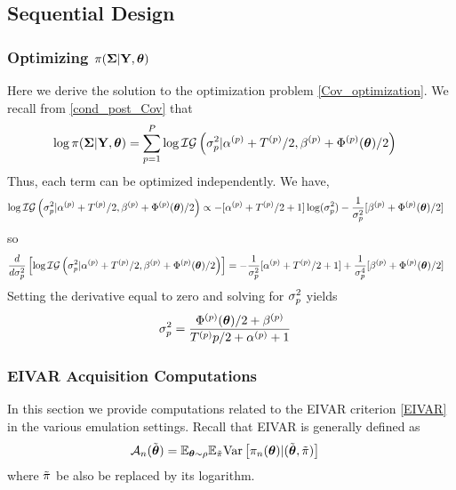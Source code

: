 \documentclass[12pt]{article}
\begin{document}
\subsection{Sequential Design}
\subsubsection{Optimizing $\pi(\boldsymbol{\Sigma}|\mathbf{Y}, \boldsymbol{\theta})$}
Here we derive the solution to the optimization problem \ref{Cov_optimization}. We recall from \ref{cond_post_Cov} that 
\begin{align*}
\log \pi(\boldsymbol{\Sigma}|\mathbf{Y}, \boldsymbol{\theta}) &= \sum_{p = 1}^{P} \log \mathcal{IG}\left(\sigma_{p}^2|{\alpha}^{(p)} + {T}^{(p)}/2, {\beta}^{(p)} + {\Phi}^{(p)}(\boldsymbol{\theta})/2 \right)
\end{align*}
Thus, each term can be optimized independently. We have, 
\begin{align*}
\log \mathcal{IG}\left(\sigma_{p}^2|{\alpha}^{(p)} + {T}^{(p)}/2, {\beta}^{(p)} + {\Phi}^{(p)}(\boldsymbol{\theta})/2 \right) &\propto -[{\alpha}^{(p)} + {T}^{(p)}/2 + 1]\log(\sigma^2_{p})
																									       - \frac{1}{\sigma^2_{p}} [{\beta}^{(p)} + {\Phi}^{(p)}(\boldsymbol{\theta})/2]
\end{align*}
so 
\begin{align*}
\frac{d}{d\sigma_{p}^2}\left[\log \mathcal{IG}\left(\sigma_{p}^2|{\alpha}^{(p)} + {T}^{(p)}/2, {\beta}^{(p)} + {\Phi}^{(p)}(\boldsymbol{\theta})/2 \right)\right] &= -\frac{1}{\sigma_{p}^2}[{\alpha}^{(p)} + {T}^{(p)}/2 + 1] + \frac{1}{\sigma_{p}^4} [{\beta}^{(p)} + {\Phi}^{(p)}(\boldsymbol{\theta})/2]
\end{align*}
Setting the derivative equal to zero and solving for $\sigma^2_{p}$ yields
\begin{align*}
\sigma_{p}^2 &= \frac{{\Phi}^{(p)}(\boldsymbol{\theta})/2 + {\beta}^{(p)}}{{T}^{(p)}{p}/2 + {\alpha}^{(p)} + 1}
\end{align*}


\subsubsection{EIVAR Acquisition Computations}
In this section we provide computations related to the EIVAR criterion \ref{EIVAR} in the various emulation settings. Recall that EIVAR is generally defined as 
\begin{align*}
\mathcal{A}_{n}(\tilde{\boldsymbol{\theta}}) &= \mathbb{E}_{\boldsymbol{\theta} \sim \rho} \mathbb{E}_{\tilde{\pi}} \mathrm{Var}\left[\pi_{n}(\boldsymbol{\theta}) | (\tilde{\boldsymbol{\theta}}, \tilde{\pi}) \right] 
\end{align*}
where $\tilde{\pi}$ be also be replaced by its logarithm. 
\end{document}
